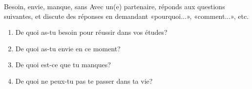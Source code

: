 \begin{frame}{Besoin, envie, manque, sans}
  Avec un(e) partenaire, réponds aux questions suivantes, et discute des réponses en demandant «pourquoi...», «comment...», etc.
  \begin{enumerate}
    \item De quoi as-tu \alert{besoin} pour réussir dans vos études?
    \item De quoi as-tu \alert{envie} en ce moment?
    \item De quoi est-ce que tu \alert{manques}?
    \item De quoi ne peux-tu pas \alert{te passer} dans ta vie?
  \end{enumerate}
\end{frame}